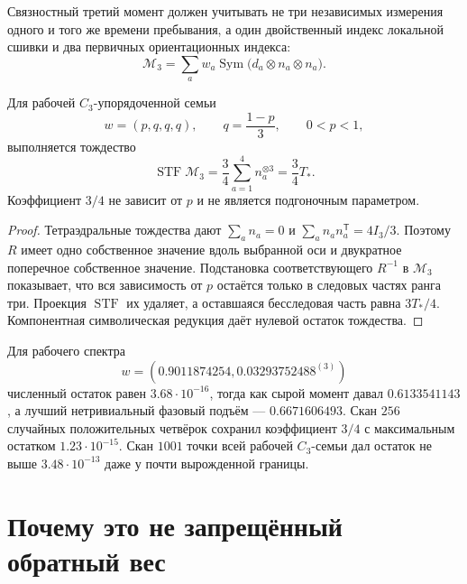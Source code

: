 Связностный третий момент должен учитывать не три независимых измерения
одного и того же времени пребывания, а один двойственный индекс локальной
сшивки и два первичных ориентационных индекса:
\begin{equation}
 \mathcal M_3
 =\sum_aw_a\operatorname{Sym}
 \bigl(d_a\otimes n_a\otimes n_a\bigr).
\end{equation}

\begin{theorem}
Для рабочей $C_3$-упорядоченной семьи
\begin{equation}
 w=(p,q,q,q),
 \qquad q=\frac{1-p}{3},
 \qquad 0<p<1,
\end{equation}
выполняется тождество
\begin{equation}
 \operatorname{STF}\mathcal M_3
 =\frac34\sum_{a=1}^{4}n_a^{\otimes3}
 =\frac34T_*.
\end{equation}
Коэффициент $3/4$ не зависит от $p$ и не является подгоночным параметром.
\end{theorem}

\begin{proof}
Тетраэдральные тождества дают
$\sum_an_a=0$ и $\sum_an_an_a^{\mathsf T}=4I_3/3$. Поэтому $R$ имеет одно
собственное значение вдоль выбранной оси и двукратное поперечное
собственное значение. Подстановка соответствующего $R^{-1}$ в
$\mathcal M_3$ показывает, что вся зависимость от $p$ остаётся только в
следовых частях ранга три. Проекция $\operatorname{STF}$ их удаляет, а
оставшаяся бесследовая часть равна $3T_*/4$. Компонентная символическая
редукция даёт нулевой остаток тождества.
\end{proof}

Для рабочего спектра
\begin{equation}
 w=(0.9011874254,0.03293752488^{(3)})
\end{equation}
численный остаток равен $3.68\cdot10^{-16}$, тогда как сырой момент давал
$0.6133541143$, а лучший нетривиальный фазовый подъём --- $0.6671606493$.
Скан $256$ случайных положительных четвёрок сохранил коэффициент $3/4$ с
максимальным остатком $1.23\cdot10^{-15}$. Скан $1001$ точки всей рабочей
$C_3$-семьи дал остаток не выше $3.48\cdot10^{-13}$ даже у почти
вырожденной границы.

\section{Почему это не запрещённый обратный вес}

